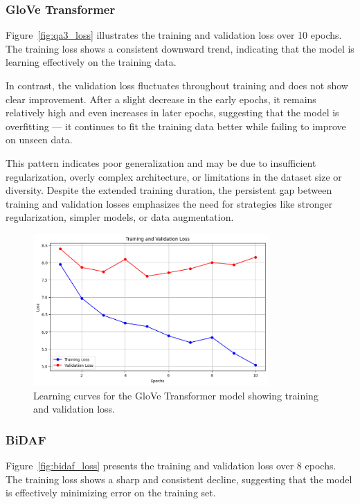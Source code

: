 \documentclass[runningheads]{llncs}
\begin{document}
\subsubsection*{GloVe Transformer}
Figure~\ref{fig:qa3_loss} illustrates the training and validation loss over 10 epochs. The training loss shows a consistent downward trend, indicating that the model is learning effectively on the training data.

In contrast, the validation loss fluctuates throughout training and does not show clear improvement. After a slight decrease in the early epochs, it remains relatively high and even increases in later epochs, suggesting that the model is overfitting — it continues to fit the training data better while failing to improve on unseen data.

This pattern indicates poor generalization and may be due to insufficient regularization, overly complex architecture, or limitations in the dataset size or diversity. Despite the extended training duration, the persistent gap between training and validation losses emphasizes the need for strategies like stronger regularization, simpler models, or data augmentation.
\begin{figure}[H]
\centering
\includegraphics[width=0.8\textwidth]{images/qa3_loss.png}
\caption{Learning curves for the GloVe Transformer model showing training and validation loss.}
\label{fig:glove_transformer_loss}
\end{figure}

\subsubsection*{BiDAF}
Figure~\ref{fig:bidaf_loss} presents the training and validation loss over 8 epochs. The training loss shows a sharp and consistent decline, suggesting that the model is effectively minimizing error on the training set.
\end{document}

